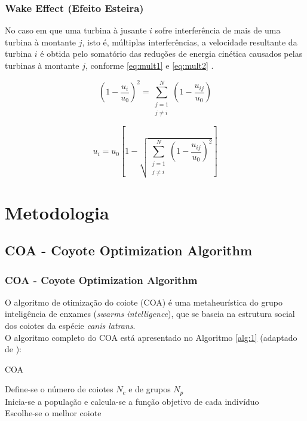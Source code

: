 \documentclass{beamer}
\begin{document}
	\begin{frame}
		\frametitle{Wake Effect (Efeito Esteira)}
		No caso em que uma turbina à jusante $ i $ sofre interferência de mais de uma turbina à montante $ j $, isto é, múltiplas interferências, a velocidade resultante da turbina $ i $ é obtida pelo somatório das reduções de energia cinética causados pelas turbinas à montante $ j $, conforme \ref{eq:mult1} e \ref{eq:mult2} \cite{pookpunt}. 
		
		\begin{equation}\label{eq:mult1}
			\left(1 - \dfrac{u_i}{u_0}\right)^2 = \sum_{\substack{j=1 \\ j\neq i}}^{N} \left(1 - \dfrac{u_{ij}}{u_0}\right)
		\end{equation}
		
		\begin{equation}\label{eq:mult2}
			u_i = u_0 \left[1 - \sqrt{\sum_{\substack{j=1 \\ j\neq i}}^{N} \left(1 - \dfrac{u_{ij}}{u_0}\right)^2}\right]
		\end{equation}
	\end{frame}

	\section{Metodologia}
	\subsection{COA - Coyote Optimization Algorithm}
	\begin{frame}
		\frametitle{COA - Coyote Optimization Algorithm}
		O algoritmo de otimização do coiote (COA) é uma metaheurística do grupo inteligência de enxames (\textit{swarms intelligence}), que se baseia na estrutura social dos coiotes da espécie \textit{canis latrans}. \\
		
		O algoritmo completo do COA está apresentado no Algoritmo \ref{alg:1} (adaptado de \cite{Pierezan2018}):
	\end{frame}

	\begin{frame}
		\begin{algorithm}[H]
			\caption{COA} 
			\label{alg:1}
			Define-se o número de coiotes $ N_c $ e de grupos $ N_p $ \\
			Inicia-se a população e calcula-se a função objetivo de cada indivíduo \\
			Escolhe-se o melhor coiote
		\end{algorithm}
	\end{frame}
\end{document}
